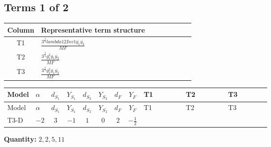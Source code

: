\documentclass[8pt]{article}
\begin{document}
\begin{landscape}
\subsection*{Terms 1 of 2}
\begin{center}
\begin{tabular}{@{}c >{\raggedright\arraybackslash}p{0.82\linewidth}@{}}
\toprule
Column & Representative term structure \\
\midrule
T1 & \(\displaystyle \frac{3^{\frac{3}{4}} lambda12Inv1 \overline{y_{1}} \overline{y_{2}}}{MF}\) \\
\midrule
T2 & \(\displaystyle \frac{3^{\frac{3}{4}} g_{1}^{2} \overline{y_{1}} \overline{y_{2}}}{MF}\) \\
\midrule
T3 & \(\displaystyle \frac{3^{\frac{3}{4}} g_{2}^{2} \overline{y_{1}} \overline{y_{2}}}{MF}\) \\
\midrule
\bottomrule
\end{tabular}
\end{center}
\smallskip
\tiny
\begin{longtable}{@{}llcccccc >{\raggedright\arraybackslash}p{0.21\linewidth} >{\raggedright\arraybackslash}p{0.21\linewidth} >{\raggedright\arraybackslash}p{0.21\linewidth}@{}}
\toprule
Model & $\alpha$ & $d_{S_1}$ & $Y_{S_1}$ & $d_{S_2}$ & $Y_{S_2}$ & $d_F$ & $Y_F$ & T1 & T2 & T3 \\
\midrule
\endfirsthead
\toprule
Model & $\alpha$ & $d_{S_1}$ & $Y_{S_1}$ & $d_{S_2}$ & $Y_{S_2}$ & $d_F$ & $Y_F$ & T1 & T2 & T3 \\
\midrule
\endhead
T3-D & $-2$ & $3$ & $-1$ & $1$ & $0$ & $2$ & $-\frac{1}{2}$ & \scriptsize\adjustbox{max width=\linewidth}{$\begin{gathered} \frac{3^{\frac{3}{4}} lambda12Inv1 \overline{y_{1}} \overline{y_{2}}}{6 MF}\end{gathered}$} & \scriptsize\adjustbox{max width=\linewidth}{$\begin{gathered} \frac{3^{\frac{3}{4}} g_{1}^{2} \overline{y_{1}} \overline{y_{2}}}{8 MF}\end{gathered}$} & \scriptsize\adjustbox{max width=\linewidth}{$\begin{gathered} \frac{11 \cdot 3^{\frac{3}{4}} g_{2}^{2} \overline{y_{1}} \overline{y_{2}}}{8 MF}\end{gathered}$} \\
\midrule
\bottomrule
\end{longtable}
\clearpage
\noindent\textbf{Quantity: }$\mathrm{2,2,5,11}$\par\smallskip

\end{landscape}
\end{document}
